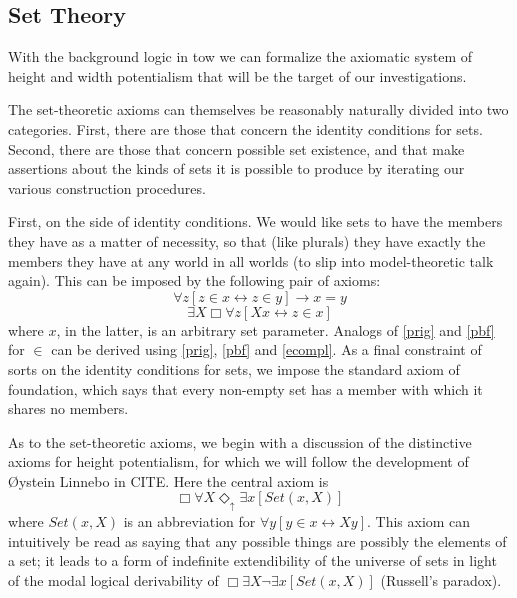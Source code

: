 \documentclass{article}
\theoremstyle{definition}
\newcommand{\du}{\Diamond_\uparrow}
\begin{document}
\subsection{Set Theory}
With the background logic in tow we can formalize the axiomatic system of height
and width potentialism that will be the target of our investigations.

The set-theoretic axioms can themselves be reasonably naturally divided into two categories.
First, there are those that concern the identity conditions for sets. Second, there are those 
that concern possible set existence, and that make assertions about the kinds of sets it is 
possible to produce by iterating our various construction procedures.

First, on the side of identity conditions. We would like sets to have the members they have as a matter of 
necessity, so that (like plurals) they have exactly the members they have at any world in all worlds
(to slip into model-theoretic talk again). This can be imposed by the following pair of axioms:
\begin{equation}
    \forall z[z \in x \leftrightarrow z \in y] \rightarrow x = y
\end{equation}
\begin{equation}\label{ecompl}
    \exists X\Box\forall z[Xx \leftrightarrow z \in x]
\end{equation}
where $x$, in the latter, is an arbitrary set parameter. 
Analogs of \eqref{prig} and \eqref{pbf} for $\in$ can be derived using \eqref{prig}, \eqref{pbf}
and \eqref{ecompl}. As a final constraint of sorts on the identity conditions for sets, we 
impose the standard axiom of foundation, which says that every non-empty set has a member with 
which it shares no members. 

As to the set-theoretic axioms, we begin with a discussion 
of the distinctive axioms for height potentialism, for which we will 
follow the development of \O ystein Linnebo in CITE.
Here the central axiom is 
\begin{equation}\label{hpot}
    \Box \forall X \du \exists x[Set(x, X)]
\end{equation}
where $Set(x, X)$ is an abbreviation for $\forall y[ y \in x \leftrightarrow Xy]$. This 
axiom can intuitively be read as saying that any possible things are possibly the elements of a set;
it leads to a form of indefinite extendibility of the universe of sets in light of the modal logical 
derivability of $\Box \exists X \neg \exists x[Set(x, X)]$ (Russell's paradox).
\end{document}
